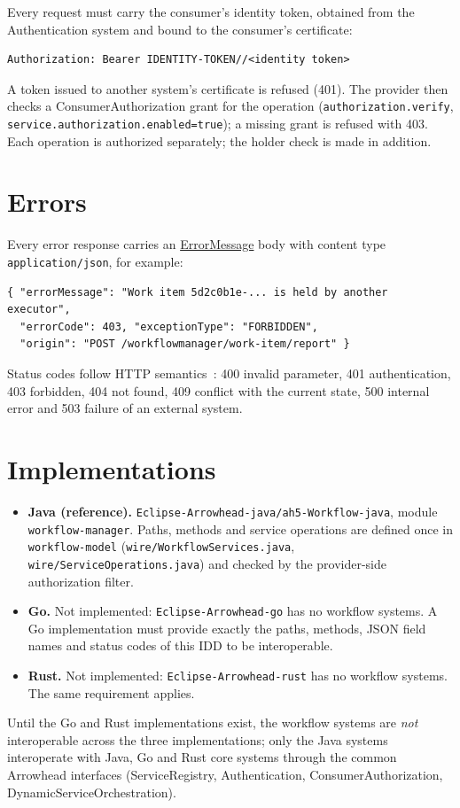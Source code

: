 \documentclass[a4paper]{arrowhead}
\newcommand{\mref}[1]{{\textcolor{ArrowheadPurple}{\hyperref[sec:model:#1]{#1}}}}
\begin{document}
Every request must carry the consumer's identity token, obtained from the Authentication system and bound to the
consumer's certificate:
\begin{lstlisting}
Authorization: Bearer IDENTITY-TOKEN//<identity token>
\end{lstlisting}
A token issued to another system's certificate is refused (401). The provider then checks a ConsumerAuthorization
grant for the operation (\texttt{authorization.\allowbreak{}verify}, \texttt{service.\allowbreak{}authorization.\allowbreak{}enabled=\allowbreak{}true}); a missing grant is
refused with 403. Each operation is authorized separately; the holder check is made in addition.


\section{Errors}
\label{sec:errors}
Every error response carries an \mref{ErrorMessage} body with content type \texttt{application/\allowbreak{}json}, for example:
\begin{lstlisting}
{ "errorMessage": "Work item 5d2c0b1e-... is held by another executor",
  "errorCode": 403, "exceptionType": "FORBIDDEN",
  "origin": "POST /workflowmanager/work-item/report" }
\end{lstlisting}
Status codes follow HTTP semantics~\cite{rfc9110}: 400 invalid parameter, 401 authentication, 403 forbidden, 404 not
found, 409 conflict with the current state, 500 internal error and 503 failure of an external system.


\section{Implementations}
\label{sec:implementations}
\begin{itemize}
\item \textbf{Java (reference).} \texttt{Eclipse-\allowbreak{}Arrowhead-\allowbreak{}java/\allowbreak{}ah5-\allowbreak{}Workflow-\allowbreak{}java}, module \texttt{workflow-\allowbreak{}manager}. Paths, methods and service
operations are defined once in \texttt{workflow-\allowbreak{}model} (\texttt{wire/\allowbreak{}Workflow\allowbreak{}Services.\allowbreak{}java}, \texttt{wire/\allowbreak{}Service\allowbreak{}Operations.\allowbreak{}java}) and checked by the provider-side authorization filter.
\item \textbf{Go.} Not implemented: \texttt{Eclipse-\allowbreak{}Arrowhead-\allowbreak{}go} has no workflow systems. A Go implementation must
provide exactly the paths, methods, JSON field names and status codes of this IDD to be interoperable.
\item \textbf{Rust.} Not implemented: \texttt{Eclipse-\allowbreak{}Arrowhead-\allowbreak{}rust} has no workflow systems. The same requirement applies.
\end{itemize}
Until the Go and Rust implementations exist, the workflow systems are \emph{not} interoperable across the three
implementations; only the Java systems interoperate with Java, Go and Rust core systems through the common Arrowhead
interfaces (ServiceRegistry, Authentication, ConsumerAuthorization, DynamicServiceOrchestration).
\end{document}
